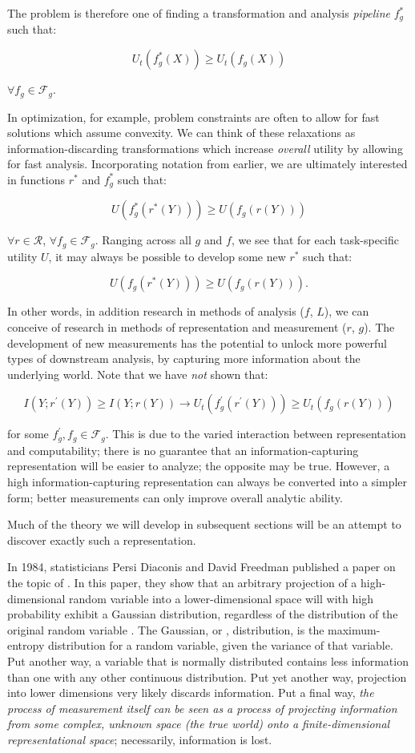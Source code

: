 The problem is therefore one of finding a transformation and analysis \textit{pipeline} $f_g^*$ such that:

\[
U_t(f_g^*(X)) \geq U_t(f_g(X))
\]

$\forall f_g \in \mathcal{F}_g$.

In optimization, for example, problem constraints are often  to allow for fast solutions which assume convexity.
We can think of these relaxations as information-discarding transformations which increase \textit{overall} utility by allowing for fast analysis.
Incorporating notation from earlier, we are ultimately interested in functions $r^*$ and $f_g^*$ such that:

\[
U(f_g^*(r^*(Y))) \geq U(f_g(r(Y)))
\]

$\forall r \in \mathcal{R}$,  $\forall f_g \in \mathcal{F}_g$. Ranging across all $g$ and $f$, we see that for each task-specific utility $U$, it may always be possible to develop some new $r^*$ such that:

\[
U(f_g(r^*(Y))) \geq U(f_g(r(Y))).
\]

In other words, in addition research in methods of analysis ($f$, $L$), we can conceive of research in methods of representation and measurement ($r$, $g$).
The development of new measurements has the potential to unlock more powerful types of downstream analysis, by capturing more information about the underlying world.
Note that we have \textit{not} shown that:

\[
I(Y; r^\prime(Y)) \geq I(Y; r(Y)) \rightarrow U_t(f_g^\prime(r^\prime(Y))) \geq U_t(f_g(r(Y)))
\]

for some $f_g^\prime, f_g \in \mathcal{F}_g$.
This is due to the varied interaction between representation and computability; there is no guarantee that an information-capturing representation will be easier to analyze; the opposite may be true.
However, a high information-capturing representation can always be converted into a simpler form; better measurements can only improve overall analytic ability.

Much of the theory we will develop in subsequent sections will be an attempt to discover exactly such a representation.

\bigskip

In 1984, statisticians Persi Diaconis and David Freedman published a paper on the topic of .
In this paper, they show that an arbitrary projection of a high-dimensional random variable into a lower-dimensional space will with high probability exhibit a Gaussian distribution, regardless of the distribution of the original random variable \cite{diaconis}.
The Gaussian, or , distribution, is the maximum-entropy distribution for a random variable, given the variance of that variable.
Put another way, a variable that is normally distributed contains less information than one with any other continuous distribution.
Put yet another way, projection into lower dimensions very likely discards information.
Put a final way, \textit{the process of measurement itself can be seen as a process of projecting information from  some complex, unknown space (the true world) onto a finite-dimensional representational space}; necessarily, information is lost.

